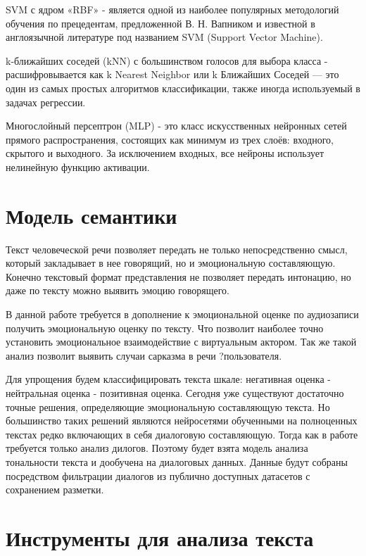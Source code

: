 SVM с ядром «RBF» -  является одной из наиболее популярных методологий обучения по прецедентам,
предложенной В. Н. Вапником и известной в англоязычной литературе под названием SVM (Support Vector Machine).

k-ближайших соседей (kNN) с большинством голосов для выбора класса - 
расшифровывается как k Nearest Neighbor или k Ближайших Соседей — это один из самых простых алгоритмов классификации, также иногда используемый в задачах регрессии. 

Многослойный персептрон (MLP) -  это класс искусственных нейронных сетей прямого распространения, состоящих как минимум из трех слоёв: входного, скрытого и выходного.
За исключением входных, все нейроны использует нелинейную функцию активации.


\section{Модель семантики}

Текст человеческой речи позволяет передать не только непосредственно смысл, который закладывает в нее говорящий,
но и эмоциональную составляющую. Конечно текстовый формат представления не позволяет передать интонацию, но
даже по тексту можно выявить эмоцию говорящего.

В данной работе требуется в дополнение к эмоциональной оценке по аудиозаписи получить эмоциональную оценку
по тексту. Что позволит наиболее точно установить эмоциональное взаимодействие с виртуальным актором.
Так же такой анализ позволит выявить случаи сарказма в речи ?пользователя.

Для упрощения будем классифицировать текста шкале:
негативная оценка - нейтральная оценка - позитивная оценка.
Сегодня уже существуют достаточно точные решения, определяющие эмоциональную составляющую текста.
Но большинство таких решений являются нейросетями обученными на полноценных текстах редко включающих в себя
диалоговую составляющую. Тогда как в работе требуется только анализ дилогов. Поэтому
будет взята модель анализа тональности текста и дообучена на диалоговых данных.
Данные будут собраны посредством фильтрации диалогов из публично доступных датасетов с сохранением разметки.

\section{Инструменты для анализа текста}

